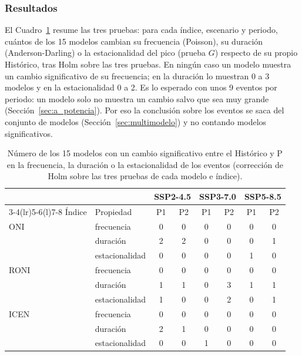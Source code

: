 \documentclass[11pt,a4paper]{article}
\begin{document}
\subsubsection{Resultados}

El Cuadro~\ref{tab:a_pruebas} resume las tres pruebas: para cada índice, escenario y periodo, cuántos de los 15 modelos cambian su frecuencia (Poisson), su duración (Anderson-Darling) o la estacionalidad del pico (prueba $G$) respecto de su propio Histórico, tras Holm sobre las tres pruebas.
En ningún caso un modelo muestra un cambio significativo de su frecuencia; en la duración lo muestran 0 a 3 modelos y en la estacionalidad 0 a 2.
Es lo esperado con unos 9 eventos por periodo: un modelo solo no muestra un cambio salvo que sea muy grande (Sección~\ref{sec:a_potencia}).
Por eso la conclusión sobre los eventos se saca del conjunto de modelos (Sección~\ref{sec:multimodelo}) y no contando modelos significativos.

\begin{table}[htbp]
\centering
\small
\caption{Número de los 15 modelos con un cambio significativo entre el Histórico y P en la frecuencia, la duración o la estacionalidad de los eventos (corrección de Holm sobre las tres pruebas de cada modelo e índice).}
\label{tab:a_pruebas}
\begin{tabular}{llcccccc}
\toprule
 & & \multicolumn{2}{c}{SSP2-4.5} & \multicolumn{2}{c}{SSP3-7.0} & \multicolumn{2}{c}{SSP5-8.5} \\
\cmidrule(lr){3-4}\cmidrule(lr){5-6}\cmidrule(l){7-8}
Índice & Propiedad & P1 & P2 & P1 & P2 & P1 & P2 \\
\midrule
ONI & frecuencia & 0 & 0 & 0 & 0 & 0 & 0 \\
 & duración & 2 & 2 & 0 & 0 & 0 & 1 \\
 & estacionalidad & 0 & 0 & 0 & 0 & 1 & 0 \\
\midrule
RONI & frecuencia & 0 & 0 & 0 & 0 & 0 & 0 \\
 & duración & 1 & 1 & 0 & 3 & 1 & 1 \\
 & estacionalidad & 1 & 0 & 0 & 2 & 0 & 1 \\
\midrule
ICEN & frecuencia & 0 & 0 & 0 & 0 & 0 & 0 \\
 & duración & 2 & 1 & 0 & 0 & 0 & 0 \\
 & estacionalidad & 0 & 0 & 1 & 0 & 0 & 0 \\
\bottomrule
\end{tabular}
\end{table}
\end{document}
